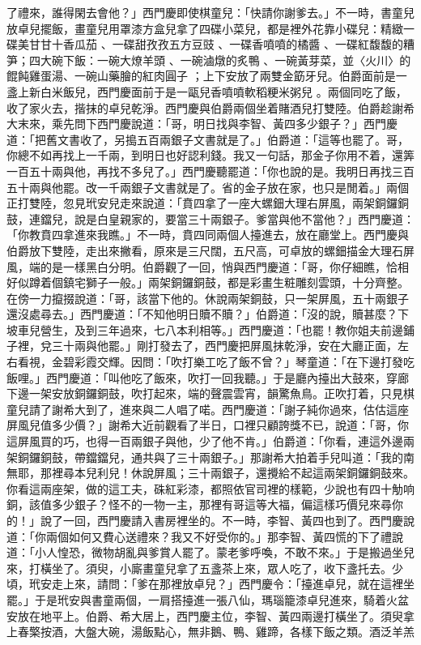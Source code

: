 了禮來，誰得閑去會他？」西門慶即使棋童兒：「快請你謝爹去。」不一時，書童兒放卓兒擺飯，畫童兒用罩漆方盒兒拿了四碟小菜兒，都是裡外花靠小碟兒：精緻一碟美甘甘十香瓜茄 、一碟甜孜孜五方豆豉 、一碟香噴噴的橘醬 、一碟紅馥馥的糟笋；四大碗下飯：一碗大燎羊頭 、一碗滷燉的炙鴨 、一碗黃芽菜，並〈火川〉的餛飩雞蛋湯、一碗山藥膾的紅肉圓子 ；上下安放了兩雙金筯牙兒。伯爵面前是一盞上新白米飯兒，西門慶面前于是一甌兒香噴噴軟稻粳米粥兒 。兩個同吃了飯，收了家火去，揩抹的卓兒乾淨。西門慶與伯爵兩個坐着賭酒兒打雙陸。伯爵趁謝希大末來，乘先問下西門慶說道：「哥，明日找與李智、黃四多少銀子？」西門慶道：「把舊文書收了，另搗五百兩銀子文書就是了。」伯爵道：「這等也罷了。哥，你總不如再找上一千兩，到明日也好認利錢。我又一句話，那金子你用不着，還筭一百五十兩與他，再找不多兒了。」西門慶聽罷道：「你也說的是。我明日再找三百五十兩與他罷。改一千兩銀子文書就是了。省的金子放在家，也只是閒着。」兩個正打雙陸，忽見玳安兒走來說道：「賁四拿了一座大螺鈿大理右屏風，兩架銅鑼銅鼓，連鐺兒，說是白皇親家的，要當三十兩銀子。爹當與他不當他？」西門慶道：「你教賁四拿進來我瞧。」不一時，賁四同兩個人擡進去，放在廳堂上。西門慶與伯爵放下雙陸，走出來撇看，原來是三尺闊，五尺高，可卓放的螺鈿描金大理石屏風，端的是一樣黑白分明。伯爵觀了一回，悄與西門慶道：「哥，你仔細瞧，恰相好似蹲着個鎮宅獅子一般。」兩架銅鑼銅鼓，都是彩畫生粧雕刻雲頭，十分齊整。在傍一力攛掇說道：「哥，該當下他的。休說兩架銅鼓，只一架屏風，五十兩銀子還沒處尋去。」西門慶道：「不知他明日贖不贖？」伯爵道：「沒的說，贖甚麼？下坡車兒營生，及到三年過來，七八本利相等。」西門慶道：「也罷！教你姐夫前邊鋪子裡，兌三十兩與他罷。」剛打發去了，西門慶把屏風抹乾淨，安在大廳正面，左右看視，金碧彩霞交輝。因問：「吹打樂工吃了飯不曾？」琴童道：「在下邊打發吃飯哩。」西門慶道：「叫他吃了飯來，吹打一回我聽。」于是廳內擡出大鼓來，穿廊下邊一架安放銅鑼銅鼓，吹打起來，端的聲震雲宵，韻驚魚鳥。正吹打着，只見棋童兒請了謝希大到了，進來與二人唱了喏。西門慶道：「謝子純你過來，估估這座屏風兒值多少價？」謝希大近前觀看了半日，口裡只顧誇獎不已，說道：「哥，你這屏風買的巧，也得一百兩銀子與他，少了他不肯。」伯爵道：「你看，連這外邊兩架銅鑼銅鼓，帶鐺鐺兒，通共與了三十兩銀子。」那謝希大拍着手兒叫道：「我的南無耶，那裡尋本兒利兒！休說屏風；三十兩銀子，還攪給不起這兩架銅鑼銅鼓來。你看這兩座架，做的這工夫，硃紅彩漆，都照依官司裡的樣範，少說也有四十觔响銅，該值多少銀子？怪不的一物一主，那裡有哥這等大福，偏這樣巧價兒來尋你的！」說了一回，西門慶請入書房裡坐的。不一時，李智、黃四也到了。西門慶說道：「你兩個如何又費心送禮來？我又不好受你的。」那李智、黃四慌的下了禮說道：「小人惶恐，微物胡亂與爹賞人罷了。蒙老爹呼喚，不敢不來。」于是搬過坐兒來，打橫坐了。須臾，小廝畫童兒拿了五盞茶上來，眾人吃了，收下盞托去。少頃，玳安走上來，請問：「爹在那裡放卓兒？」西門慶令：「擡進卓兒，就在這裡坐罷。」于是玳安與書童兩個，一肩搭擡進一張八仙，瑪瑙籠漆卓兒進來，騎着火盆安放在地平上。伯爵、希大居上，西門慶主位，李智、黃四兩邊打橫坐了。須臾拿上春檠按酒，大盤大碗，湯飯點心，無非鵝、鴨、雞蹄，各樣下飯之類。酒泛羊羔 
